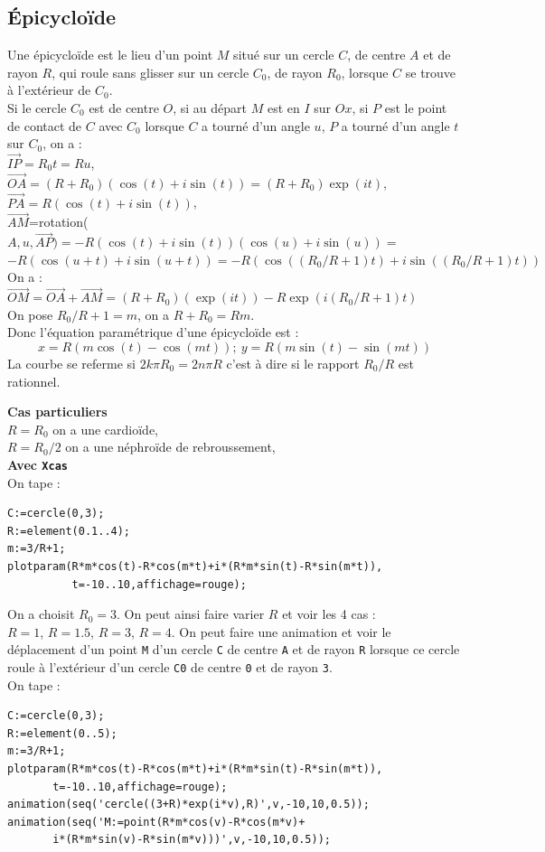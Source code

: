 \documentclass[a4paper,11pt]{book}
\begin{document}
\subsection{\'Epicyclo\"ide}\label{sec:epi}
Une \'epicyclo\"ide est le lieu d'un point $M$ situ\'e sur un cercle $C$, de 
centre $A$ et de rayon $R$, qui 
roule sans glisser sur un cercle $C_0$, de rayon
$R_0$, lorsque $C$ se trouve \`a l'ext\'erieur de $C_0$.\\
Si le cercle $C_0$ est de centre $O$, si au d\'epart $M$ est en $I$ sur $Ox$, 
 si $P$ est le point de contact de $C$ avec 
$C_0$ lorsque $C$ a tourn\'e d'un angle $u$, $P$ a tourn\'e d'un angle 
$t$ sur $C_0$, on a :\\
$\overrightarrow{IP}=R_0t=Ru$,\\
$\overrightarrow{OA}=(R+R_0)(\cos(t)+i\sin(t))=(R+R_0)\exp(it)$,\\
$\overrightarrow{PA}=R(\cos(t)+i\sin(t))$,\\
$\overrightarrow{AM}$=rotation($A,u,\overrightarrow{AP})=-R(\cos(t)+i\sin(t))(\cos(u)+i\sin(u))=$\\
$-R(\cos(u+t)+i\sin(u+t))=-R(\cos((R_0/R+1)t)+i\sin((R_0/R+1)t))$\\
On a :\\
$\overrightarrow{OM}=\overrightarrow{OA}+\overrightarrow{AM}=
(R+R_0)(\exp(it))-R\exp(i(R_0/R+1)t)$\\
On pose $R_0/R+1=m$, on a $R+R_0=Rm$.\\ 
Donc l'\'equation param\'etrique d'une \'epicyclo\"ide est :\\
$$x=R(m\cos(t)-\cos(mt)); \ y=R(m\sin(t)-\sin(mt))$$ 
La courbe se referme si $2k\pi R_0=2n\pi R$ c'est \`a dire si le rapport 
$R_0/R$ est rationnel.

{\bf Cas particuliers}\\
$R=R_0$ on a une cardio\"ide,\\
$R=R_0/2$ on a une n\'ephro\"ide de rebroussement,\\
{\bf Avec {\tt Xcas}}\\
On tape :
\begin{verbatim}
C:=cercle(0,3);
R:=element(0.1..4);
m:=3/R+1;
plotparam(R*m*cos(t)-R*cos(m*t)+i*(R*m*sin(t)-R*sin(m*t)),
          t=-10..10,affichage=rouge);
\end{verbatim}
On a choisit $R_0=3$. On peut ainsi faire varier $R$ et voir les 4 cas :\\
$R=1$, $R=1.5$, $R=3$, $R=4$.
On peut faire une animation et voir le d\'eplacement d'un point {\tt M} d'un 
cercle {\tt C} de centre {\tt A} et de rayon {\tt R} lorsque ce cercle roule 
\`a l'ext\'erieur d'un cercle {\tt C0} de centre {\tt 0} et de rayon {\tt 3}.\\
On tape :
\begin{verbatim}
C:=cercle(0,3);
R:=element(0..5);
m:=3/R+1;
plotparam(R*m*cos(t)-R*cos(m*t)+i*(R*m*sin(t)-R*sin(m*t)),
       t=-10..10,affichage=rouge);
animation(seq('cercle((3+R)*exp(i*v),R)',v,-10,10,0.5));
animation(seq('M:=point(R*m*cos(v)-R*cos(m*v)+
       i*(R*m*sin(v)-R*sin(m*v)))',v,-10,10,0.5));
\end{verbatim}
\end{document}
